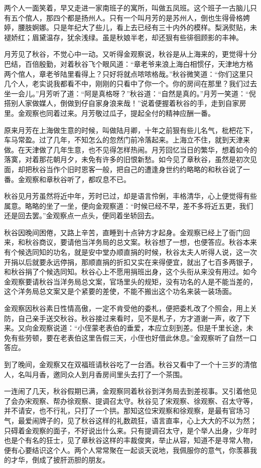\documentclass[12pt,UTF8]{ctexbook}
\begin{document}
{{{两个人一面笑着，早又走进一家南班子的寓所，叫做五凤班。这个班子一古脑儿只有五个倌人，那四个都是扬州人。只有一个叫月芳的是苏州人，倒也生得骨格娉婷，腰肢婀娜。只是年纪大了些儿，看上去已经有三十内外的模样。梨涡熨贴，未褪娇红；眉黛温存，犹余浅绿。虽是秋娘半老，却还狠有些徘徊顾影的丰神。

月芳见了秋谷，不觉心中一动。又听得金观察说，秋谷是从上海来的，更觉得十分巴结，百倍殷勤，对着秋谷飞个眼风道：“章老爷来浪上海白相惯仔，天津地方格两个倌人，章老爷陆里看得上？只好将就点哝哝格哉。”秋谷微笑道：“你们这里只几个人，老实说我都看不中，刚刚的只看中了你一个。你的房间在那里？我们过去坐一会儿。”月芳听了道：“阿是真格呀？”秋谷道：“自然是真的。”月芳一笑道：“倪搭别人家做媒人，倒做到仔自家身浪来哉！”说着便握着秋谷的手，走到自家房里。金观察也同着过来。月芳敬过瓜子，提起全付的精神应酬一番。

原来月芳在上海做生意的时候，叫做陆月卿，十年之前狠有些儿名气，枇杷花下，车马常盈。过了几年，不知怎么的忽然门前冷落起来。上海立不住，就到天津来做。在天津做了几年生意，也不见得怎样热闹。月芳回忆当日的繁华，想着如今的落寞，对着那花朝月夕，未免有许多的旧恨新愁。如今见了章秋谷，虽然是初次见面，却把秋谷当作个旧时恩客一般，把自己的遭逢身世约约略略的和秋谷说了一番。金观察和章秋谷听了，都叹息不已。

秋谷见月芳虽然将近中年，芳时已过，却是语言伶俐，丰格清华，心上便觉得有些属意。略略的坐了一坐，便向金观察道：“时候已经不早，差不多将近五更，我们还是回去罢。”金观察点一点头，便同着坐轿回去。

秋谷因晚间困倦，又路上辛苦，直睡到十点钟方才起身。金观察已经上了衙门回来，和秋谷商议，要请他当洋务局的总文案。秋谷想了一想，也便答应。秋谷本来有个候选同知的功名，就是安中堂办顺直捐的时候，秋谷太夫人听得人说，这一次开捐以后就要永远停捐，那顺直捐的折扣又实在来得便宜，就出了七百多两银子，和秋谷捐了个候选同知。秋谷心上不愿用捐班出身，这个头衔从来没有用过。如今金观察要请秋谷当洋务局总文案，官场里头的规矩，没有功名的人是不能当差的，这个洋务局总文案又是个紧要的差使，不能不搬出这个功名来装一装场面。

金观察因秋谷素日性情高傲，一定不肯受他的委札，便把委札改了个照会，用上关防，自己亲手送交秋谷。秋谷接过来看时，见不是札子，方才道谢一声，收了下来。又向金观察说道：“小侄蒙老表伯的垂爱，本应立刻到差。但是千里长途，未免有些劳顿，要在老表伯这里告假三天，小侄也好借此休息。”金观察听了自然一口答应。

到了晚间，金观察又在双福班请秋谷吃了一台酒。秋谷又看中了一个十三岁的清倌人，名叫月香，邀同众人到月香房间里头去打了一个茶围。

一连闹了几天，秋谷假期已满，金观察同着秋谷到洋务局去到差视事。又引着他见了会办宋观察、帮办徐观察、提调召太守。秋谷见了宋观察、徐观察、召太守等，并不请安，也不行礼，只打了一个拱。那知这位宋观察和徐观察，是最有官场习气，最爱闹牌子的，见了秋谷这样的礼数疏狂，语言直率，心上大大的不以为然；只碍着金观察的面子，不好说出什么来。只有提调召太守，是个举人出身，少年时也是个有名的狂士，见了章秋谷这样的丰裁俊爽，举止从容，知道不是寻常人物，便有心要结识这个人。两个人常常聚在一起谈天说地，我佩服你的意气，你羡慕我的才华，倒成了披肝沥胆的朋友。

}}}
\end{document}
